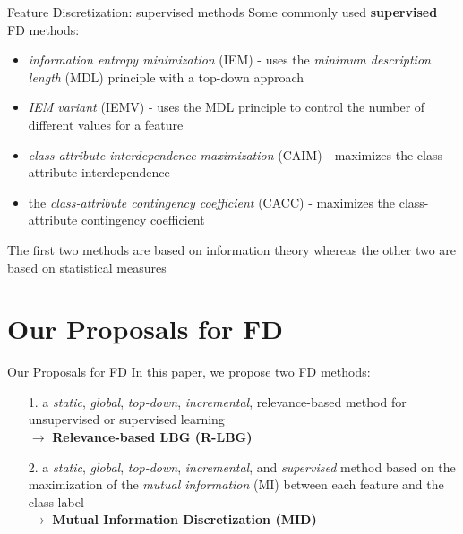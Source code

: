 \documentclass{beamer}
\begin{document}
\begin{frame}{Feature Discretization: supervised methods}
Some commonly used \textbf{supervised} FD methods:
\begin{itemize}
	\vfill
	\item \emph{information entropy minimization} (IEM) - uses 
	the \emph{minimum description length} (MDL) principle with a top-down approach
	
	\vfill
	\item \emph{IEM variant} (IEMV) - uses the MDL
principle to control the number of different
values for a feature 

	\vfill
	\item \emph{class-attribute interdependence maximization} 
	(CAIM) - maximizes the class-attribute interdependence
	
  \vfill
	\item the \emph{class-attribute contingency
coefficient} (CACC) - maximizes the class-attribute 
contingency coefficient
\end{itemize}

\vfill
The first two methods are based on information theory whereas the other two are based on statistical measures
\end{frame}


\section[Our Proposals]{Our Proposals for FD}
\begin{frame}{Our Proposals for FD}
\vfill
In this paper, we propose two FD methods:
\begin{itemize}
	\vfill
	\item [1.] a \emph{static}, \emph{global}, \emph{top-down}, \emph{incremental}, relevance-based method for unsupervised
	or supervised learning\\ 
	$\longrightarrow$ \textbf{Relevance-based LBG (R-LBG)}
	
	\vfill
	\item [2.] a \emph{static}, \emph{global}, \emph{top-down}, \emph{incremental}, and 
	\emph{supervised} method based on the maximization of 
	the \emph{mutual information} (MI) between each feature
	and the class label \\ 
	$\longrightarrow$ \textbf{Mutual Information Discretization (MID)}
\end{itemize}
\end{frame}


\end{document}
